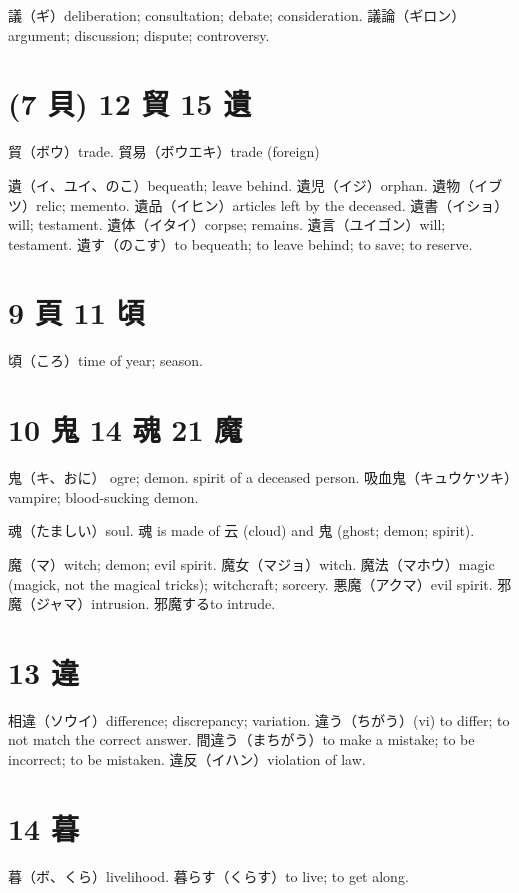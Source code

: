 議（ギ）deliberation; consultation; debate; consideration.
議論（ギロン）argument; discussion; dispute; controversy.

\section{(7 貝) 12 貿 15 遺}

貿（ボウ）trade.
貿易（ボウエキ）trade (foreign)

遺（イ、ユイ、のこ）bequeath; leave behind.
遺児（イジ）orphan.
遺物（イブツ）relic; memento.
遺品（イヒン）articles left by the deceased.
遺書（イショ）will; testament.
遺体（イタイ）corpse; remains.
遺言（ユイゴン）will; testament.
遺す（のこす）to bequeath; to leave behind; to save; to reserve.

\section{9 頁 11 頃}

頃（ころ）time of year; season.

\section{10 鬼 14 魂 21 魔}

鬼（キ、おに）
ogre; demon.
spirit of a deceased person.
吸血鬼（キュウケツキ）vampire; blood-sucking demon.

魂（たましい）soul.
魂 is made of 云 (cloud) and 鬼 (ghost; demon; spirit).

魔（マ）witch; demon; evil spirit.
魔女（マジョ）witch.
魔法（マホウ）magic (magick, not the magical tricks); witchcraft; sorcery.
悪魔（アクマ）evil spirit.
邪魔（ジャマ）intrusion.
邪魔するto intrude.

\section{13 違}

相違（ソウイ）difference; discrepancy; variation.
違う（ちがう）(vi) to differ; to not match the correct answer.
間違う（まちがう）to make a mistake; to be incorrect; to be mistaken.
違反（イハン）violation of law.

\section{14 暮}

暮（ボ、くら）livelihood.
暮らす（くらす）to live; to get along.

